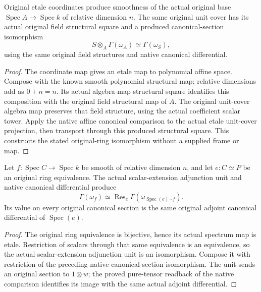 \begin{lemma}
\label{lem:kn-global-trace-actual-base-unit-sections}
\leanok
Original etale coordinates produce smoothness of the actual original
base $\operatorname{Spec}A\to\operatorname{Spec}k$ of relative dimension
$n$.  The same original unit cover has its actual original field
structural square and a produced canonical-section isomorphism
\[
 S\otimes_A\Gamma(\omega_A)\simeq\Gamma(\omega_S),
\]
using the same original field structures and native canonical differential.
\end{lemma}
\begin{proof}
The coordinate map gives an etale map to polynomial affine space.  Compose
with the known smooth polynomial structural map; relative dimensions
add as $0+n=n$.  Its actual algebra-map structural square identifies
this composition with the original field structural map of $A$.
The original unit-cover algebra map preserves that field structure,
using the actual coefficient scalar tower.  Apply the native affine
canonical comparison to the actual etale unit-cover projection, then
transport through this produced structural square.  This constructs
the stated original-ring isomorphism without a supplied frame or map.
\end{proof}

\begin{lemma}
\label{lem:kn-global-trace-native-equivalence-sections}
\leanok
Let $f:\operatorname{Spec}C\to\operatorname{Spec}k$ be smooth of relative
dimension $n$, and let $e:C\simeq P$ be an original ring equivalence.
The actual scalar-extension adjunction unit and native canonical
differential produce
\[
 \Gamma(\omega_f)\simeq\operatorname{Res}_e\Gamma(\omega_{\operatorname{Spec}(e)\circ f}).
\]
Its value on every original canonical section is the same original
adjoint canonical differential of $\operatorname{Spec}(e)$.
\end{lemma}
\begin{proof}
The original ring equivalence is bijective, hence its actual spectrum
map is etale.  Restriction of scalars through that same equivalence is
an equivalence, so the actual scalar-extension adjunction unit is an
isomorphism.  Compose it with restriction of the preceding native
canonical-section isomorphism.  The unit sends an original section to
$1\otimes w$; the proved pure-tensor readback of the native comparison
identifies its image with the same actual adjoint differential.
\end{proof}

